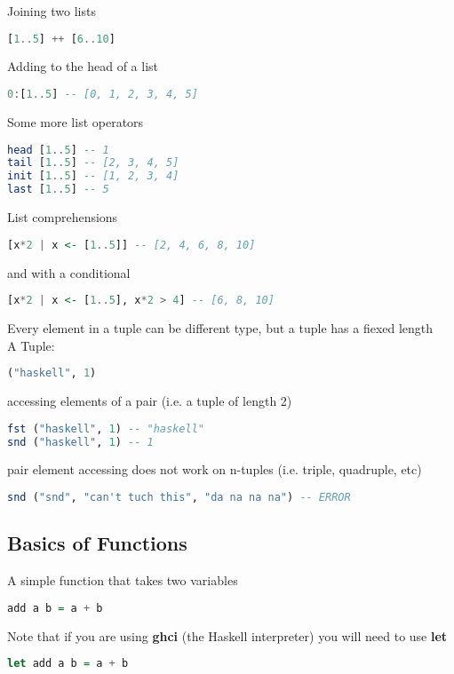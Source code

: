 Joining two lists
\begin{lstlisting}[language=Haskell]
[1..5] ++ [6..10]
\end{lstlisting}

Adding to the head of a list
\begin{lstlisting}[language=Haskell]
0:[1..5] -- [0, 1, 2, 3, 4, 5]
\end{lstlisting}

Some more list operators
\begin{lstlisting}[language=Haskell]
head [1..5] -- 1
tail [1..5] -- [2, 3, 4, 5]
init [1..5] -- [1, 2, 3, 4]
last [1..5] -- 5
\end{lstlisting}

List comprehensions
\begin{lstlisting}[language=Haskell]
[x*2 | x <- [1..5]] -- [2, 4, 6, 8, 10]
\end{lstlisting}

and with a conditional
\begin{lstlisting}[language=Haskell]
[x*2 | x <- [1..5], x*2 > 4] -- [6, 8, 10]
\end{lstlisting}

Every element in a tuple can be different type, but a tuple has a fiexed length
\\A Tuple:
\begin{lstlisting}[language=Haskell]
("haskell", 1)
\end{lstlisting}

accessing elements of a pair (i.e. a tuple of length 2)
\begin{lstlisting}[language=Haskell]
fst ("haskell", 1) -- "haskell"
snd ("haskell", 1) -- 1
\end{lstlisting}

pair element accessing does not work on n-tuples (i.e. triple, quadruple, etc)
\begin{lstlisting}[language=Haskell]
snd ("snd", "can't tuch this", "da na na na") -- ERROR
\end{lstlisting}

\subsection{Basics of Functions}

A simple function that takes two variables
\begin{lstlisting}[language=Haskell]
add a b = a + b
\end{lstlisting}

Note that if you are using \textbf{ghci} (the Haskell interpreter)
you will need to use \textbf{let}
\begin{lstlisting}[language=Haskell]
let add a b = a + b
\end{lstlisting}

